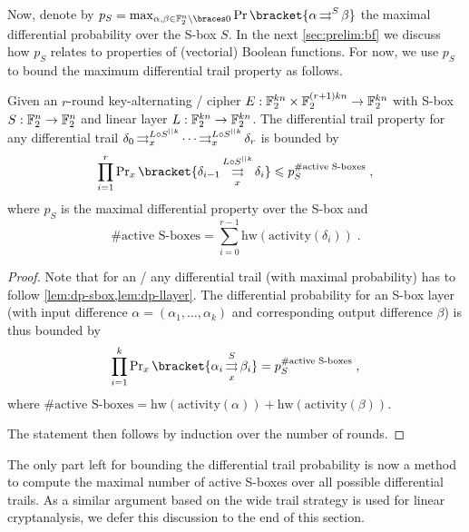Now, denote by $p_S = \max_{\alpha, \beta \in \F_2^n \setminus \set{0}} \Prob\bracket{\propDiff{\alpha}{S}{}{\beta}}$ the maximal differential probability over the S-box $S$.
In the next \cref{sec:prelim:bf} we discuss how $p_S$ relates to properties of (vectorial) Boolean functions.
For now, we use $p_S$ to bound the maximum differential trail property as follows.
\begin{lemma}\label{lem:bound-dp-trail}
    Given an $r$-round key-alternating \SPN/ cipher $E : \mathbb{F}_2^{kn} \times \mathbb{F}_2^{(r+1)kn} \to \mathbb{F}_2^{kn}$ with S-box $S : \mathbb{F}_2^n \to \mathbb{F}_2^n$ and linear layer $L : \mathbb{F}_2^{kn} \to \mathbb{F}_2^{kn}$.
    The differential trail property for any differential trail $\delta_0 \operatorname*{\rightrightarrows}^{L \circ S^{||k}}_{x} \cdots \operatorname*{\rightrightarrows}^{L \circ S^{||k}}_{x} \delta_r$ is bounded by
    \begin{equation*}
        \prod_{i=1}^r \Prob_x\bracket{\propDiff{\delta_{i-1}}{L \circ S^{||k}}{x}{\delta_i}}
        \leqslant p_S^{\text{\#active S-boxes}}\;,
    \end{equation*}
    where $p_S$ is the maximal differential property over the S-box and
    \begin{equation*}
        \text{\#active S-boxes} = \sum_{i=0}^{r-1} \mathrm{hw}(\mathrm{activity}(\delta_i))\;.
    \end{equation*}
\end{lemma}
\begin{proof}
    Note that for an \SPN/ any differential trail (with maximal probability) has to follow \cref{lem:dp-sbox,lem:dp-llayer}.
    The differential probability for an S-box layer (with input difference $\alpha = (\alpha_1, \ldots, \alpha_k)$ and corresponding output difference $\beta$) is thus bounded by
    \begin{equation*}
        \prod_{i=1}^k \Prob_x\bracket{\propDiff{\alpha_i}{S}{x}{\beta_i}} = p_S^{\text{\#active S-boxes}}\;,
    \end{equation*}
    where $\text{\#active S-boxes} = \mathrm{hw}(\mathrm{activity}(\alpha)) + \mathrm{hw}(\mathrm{activity}(\beta))$.

    The statement then follows by induction over the number of rounds.
\end{proof}

The only part left for bounding the differential trail probability is now a method to compute the maximal number of active S-boxes over all possible differential trails.
As a similar argument based on the wide trail strategy is used for linear cryptanalysis, we defer this discussion to the end of this section.

